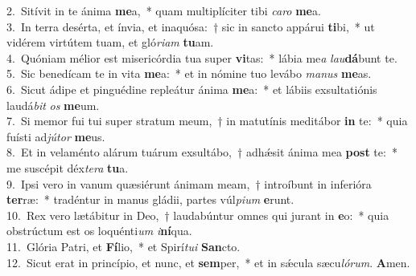 {2.~}Sitívit in te ánima \textbf{me}a,~* quam multiplíciter tibi \textit{ca}\textit{ro} \textbf{me}a.\\
{3.~}In terra desérta, et ínvia, et inaquósa:~† sic in sancto appárui \textbf{ti}bi,~* ut vidérem virtútem tuam, et gló\textit{ri}\textit{am} \textbf{tu}am.\\
{4.~}Quóniam mélior est misericórdia tua super \textbf{vi}tas:~* lábia me\textit{a} \textit{lau}\textbf{dá}bunt te.\\
{5.~}Sic benedícam te in vita \textbf{me}a:~* et in nómine tuo levábo \textit{ma}\textit{nus} \textbf{me}as.\\
{6.~}Sicut ádipe et pinguédine repleátur ánima \textbf{me}a:~* et lábiis exsultatiónis laudá\textit{bit} \textit{os} \textbf{me}um.\\
{7.~}Si memor fui tui super stratum meum,~† in matutínis meditábor \textbf{in} te:~* quia fuísti ad\textit{jú}\textit{tor} \textbf{me}us.\\
{8.~}Et in velaménto alárum tuárum exsultábo,~† adhǽsit ánima mea \textbf{post} te:~* me suscépit déx\textit{te}\textit{ra} \textbf{tu}a.\\
{9.~}Ipsi vero in vanum quæsiérunt ánimam meam,~† introíbunt in inferióra \textbf{ter}ræ:~* tradéntur in manus gládii, partes vúl\textit{pi}\textit{um} \textbf{e}runt.\\
{10.~}Rex vero lætábitur in Deo,~† laudabúntur omnes qui jurant in \textbf{e}o:~* quia obstrúctum est os loquénti\textit{um} \textit{i}\textbf{ní}qua.\\
{11.~}Glória Patri, et \textbf{Fí}lio,~* et Spirí\textit{tu}\textit{i} \textbf{San}cto.\\
{12.~}Sicut erat in princípio, et nunc, et \textbf{sem}per,~* et in sǽcula sæcu\textit{ló}\textit{rum}. \textbf{A}men.\\
